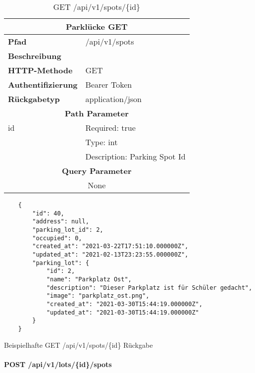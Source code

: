 \begin{table}[H]
  \centering
  \begin{tabular}{|l|l|}
  \hline
  \multicolumn{2}{|c|}{\textbf{Parklücke GET}}         \\ \hline
  \textbf{Pfad}              & /api/v1/spots        \\ \hline
  \textbf{Beschreibung}      &                           \\ \hline
  \textbf{HTTP-Methode}      & GET                       \\ \hline
  \textbf{Authentifizierung} & Bearer Token              \\ \hline
  \textbf{Rückgabetyp}       & application/json          \\ \hline
  \multicolumn{2}{|c|}{\textbf{Path Parameter}}          \\ \hline
  id                         & Required: true            \\ \hline
                             & Type: int                 \\ \hline
                             & Description: Parking Spot Id \\ \hline
  \multicolumn{2}{|c|}{\textbf{Query Parameter}}                      \\ \hline
  \multicolumn{2}{|c|}{None}          \\ \hline
  \end{tabular}
  \caption{GET /api/v1/spots/\{id\}}
\end{table}

\begin{listing}[H]
  \begin{verbatim}
    {
        "id": 40,
        "address": null,
        "parking_lot_id": 2,
        "occupied": 0,
        "created_at": "2021-03-22T17:51:10.000000Z",
        "updated_at": "2021-02-13T23:23:55.000000Z",
        "parking_lot": {
            "id": 2,
            "name": "Parkplatz Ost",
            "description": "Dieser Parkplatz ist für Schüler gedacht",
            "image": "parkplatz_ost.png",
            "created_at": "2021-03-30T15:44:19.000000Z",
            "updated_at": "2021-03-30T15:44:19.000000Z"
        }
    }
  \end{verbatim}
  \caption{Beispielhafte GET /api/v1/spots/\{id\} Rückgabe}
\end{listing}

\paragraph{POST /api/v1/lots/\{id\}/spots}\mbox{}\\

